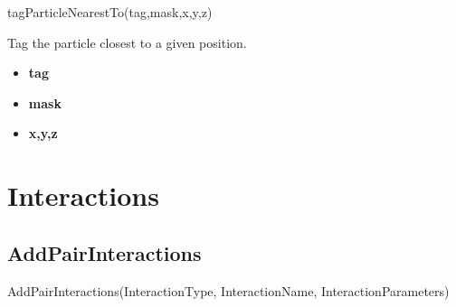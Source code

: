 \documentclass{report}
\begin{document}
\textsf{tagParticleNearestTo(tag,mask,x,y,z)}
\par \medskip
Tag the particle closest to a given position.
\begin{itemize}
\item \textbf{tag}
\item \textbf{mask}
\item \textbf{x,y,z}
\end{itemize}

\section{Interactions}


\subsection{AddPairInteractions}

\textsf{AddPairInteractions(InteractionType, InteractionName, InteractionParameters)}
\par \medskip
\end{document}
